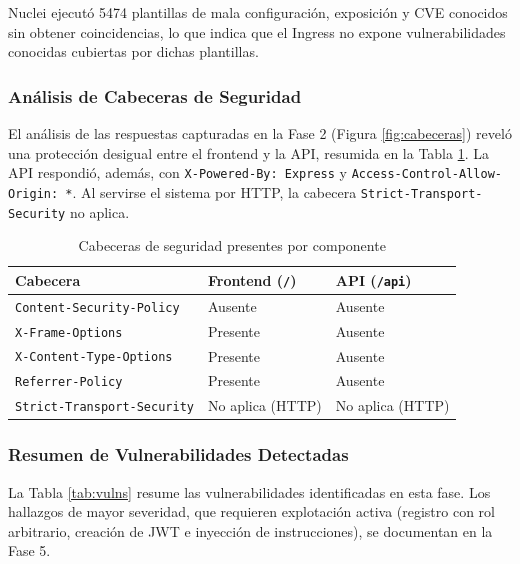 \documentclass[stu,11pt,spanish,floatsintext]{apa7}
\begin{document}
Nuclei ejecutó 5474 plantillas de mala configuración, exposición y CVE conocidos sin obtener coincidencias, lo que indica que el Ingress no expone vulnerabilidades conocidas cubiertas por dichas plantillas.

\subsubsection{Análisis de Cabeceras de Seguridad}

El análisis de las respuestas capturadas en la Fase 2 (Figura \ref{fig:cabeceras}) reveló una protección desigual entre el frontend y la API, resumida en la Tabla \ref{tab:cabeceras}. La API respondió, además, con \texttt{X-Powered-By: Express} y \texttt{Access-Control-Allow-Origin: *}. Al servirse el sistema por HTTP, la cabecera \texttt{Strict-Transport-Security} no aplica.

\begin{table}[H]
  \centering
  \caption{Cabeceras de seguridad presentes por componente}
  \label{tab:cabeceras}
  \begin{tabularx}{\textwidth}{X l l}
    \toprule
    \textbf{Cabecera} & \textbf{Frontend (\texttt{/})} & \textbf{API (\texttt{/api})} \\
    \midrule
    \texttt{Content-Security-Policy} & Ausente & Ausente \\
    \texttt{X-Frame-Options} & Presente & Ausente \\
    \texttt{X-Content-Type-Options} & Presente & Ausente \\
    \texttt{Referrer-Policy} & Presente & Ausente \\
    \texttt{Strict-Transport-Security} & No aplica (HTTP) & No aplica (HTTP) \\
    \bottomrule
  \end{tabularx}
\end{table}

\subsubsection{Resumen de Vulnerabilidades Detectadas}

La Tabla \ref{tab:vulns} resume las vulnerabilidades identificadas en esta fase. Los hallazgos de mayor severidad, que requieren explotación activa (registro con rol arbitrario, creación de JWT e inyección de instrucciones), se documentan en la Fase 5.
\end{document}
